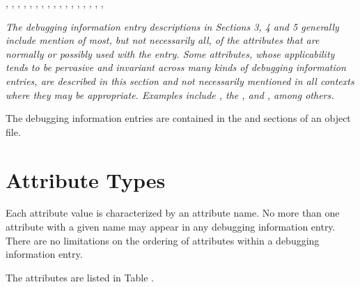 \begin{table}[p]
{,
,
,
,
,
,
,
,
,
,
,
,
,
,
,
,
,
}
\simplerule[6in]
\end{table}


\textit{The debugging information entry descriptions 
in Sections 3, 4 and 5 generally include mention of
most, but not necessarily all, of the attributes 
that are normally or possibly used with the entry.
Some attributes, whose applicability tends to be 
pervasive and invariant across many kinds of
debugging information entries, are described in 
this section and not necessarily mentioned in all
contexts where they may be appropriate. 
Examples include 
, 
the , and 
, 
among others.}

The debugging information entries are contained 
in the \dotdebuginfo{} and 
\dotdebugtypes{}
sections of an object file.


\section{Attribute Types}
\label{chap:attributetypes}
Each attribute value is characterized by an attribute name. 
No more than one attribute with a given name may appear in any
debugging information entry. 
There are no limitations on the
ordering of attributes within a debugging information entry.

The attributes are listed in Table .  

